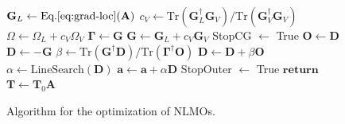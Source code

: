 \documentclass[aps,prl,reprint,amsmath,amssymb]{revtex4-1}
\begin{document}
\begin{figure}
\begin{algorithm}[H]
\begin{algorithmic}[1]
			\State $\mathbf{G}_{L} \gets \text{Eq.\ref{eq:grad-loc}}(\mathbf{A})$ 
				\State $c_{V} \gets \text{Tr}(\mathbf{G}_L^{\dagger} \mathbf{G}_V)/\text{Tr}(\mathbf{G}_V^{\dagger}\mathbf{G}_V)$
			\EndIf
			\State $\Omega \gets \Omega_{L} + c_V \Omega_{V} $ 
				\State $\mathbf{\Gamma} \gets \mathbf{G}$ 
			\EndIf 
			\State $\mathbf{G} \gets \mathbf{G}_{L} + c_V \mathbf{G}_{V} $ 
				\State StopCG $\gets$ True
			\EndIf
					\State $\mathbf{O} \gets \mathbf{D}$ 
				\EndIf
				\State $\mathbf{D} \gets - \mathbf{G}$ 
					\State $\beta \gets \text{Tr}(\mathbf{G}^{\dagger} \mathbf{D})/\text{Tr}(\mathbf{\Gamma}^{\dagger}\mathbf{O})$
					\State $\mathbf{D} \gets \mathbf{D} + \beta \mathbf{O}$ 
				\EndIf 
				\State $\alpha \gets \text{LineSearch}(\mathbf{D})$ 
				\State $\mathbf{a}\gets \mathbf{a} + \alpha \mathbf{D}$ 
			\EndIf
			\State StopOuter $\gets$ True
		\EndIf
	\State $\mathbf{return}$ $\mathbf{T} \gets \mathbf{T}_0 \mathbf{A} $ 
   \end{algorithmic}
\end{algorithm}
\caption{\label{fig:cg} Algorithm for the optimization of NLMOs.}
\end{figure}
\end{document}
